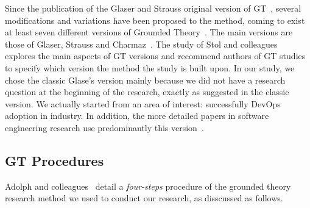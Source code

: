 Since the publication of the Glaser and Strauss original version of GT~\cite{glase1967discovery},
several modifications and variations have been proposed to the method, coming to
exist at least seven different versions of Grounded Theory~\cite{denzin2007grounded}.
The main versions are those of Glaser, Strauss and
Charmaz~\cite{stol2016grounded}. The study of Stol and colleagues~\cite{stol2016grounded}
explores the main aspects of GT versions and recommend authors of GT studies to
specify which version the method the study is built upon. In our study, we chose the classic
Glase's version mainly because we did not have a research
question at the beginning of the research, exactly as suggested in the classic
version. We actually started from an area of interest: successfully DevOps adoption
in industry. In addition, the more detailed papers in
software engineering research use predominantly this version~\cite{stol2016grounded}.

\subsection{GT Procedures}




Adolph and colleagues~\cite{adolph2011using} detail a \emph{four-steps} procedure
of the grounded theory research method we used to conduct our 
research, as disscussed as follows. 


